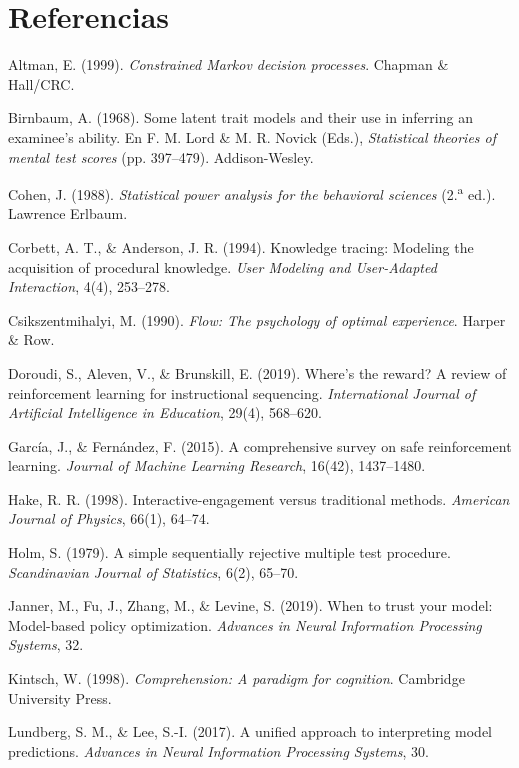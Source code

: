 \documentclass[10.5pt,a4paper]{article}
\begin{document}
\section*{Referencias}
{\small
\begin{list}{}{\setlength{\leftmargin}{1.5em}\setlength{\itemindent}{-1.5em}\setlength{\itemsep}{3pt}\setlength{\parsep}{0pt}}
\item Altman, E. (1999). \textit{Constrained Markov decision processes}. Chapman \& Hall/CRC.
\item Birnbaum, A. (1968). Some latent trait models and their use in inferring an examinee's ability. En F. M. Lord \& M. R. Novick (Eds.), \textit{Statistical theories of mental test scores} (pp. 397--479). Addison-Wesley.
\item Cohen, J. (1988). \textit{Statistical power analysis for the behavioral sciences} (2.\textsuperscript{a} ed.). Lawrence Erlbaum.
\item Corbett, A. T., \& Anderson, J. R. (1994). Knowledge tracing: Modeling the acquisition of procedural knowledge. \textit{User Modeling and User-Adapted Interaction}, 4(4), 253--278.
\item Csikszentmihalyi, M. (1990). \textit{Flow: The psychology of optimal experience}. Harper \& Row.
\item Doroudi, S., Aleven, V., \& Brunskill, E. (2019). Where's the reward? A review of reinforcement learning for instructional sequencing. \textit{International Journal of Artificial Intelligence in Education}, 29(4), 568--620.
\item García, J., \& Fernández, F. (2015). A comprehensive survey on safe reinforcement learning. \textit{Journal of Machine Learning Research}, 16(42), 1437--1480.
\item Hake, R. R. (1998). Interactive-engagement versus traditional methods. \textit{American Journal of Physics}, 66(1), 64--74.
\item Holm, S. (1979). A simple sequentially rejective multiple test procedure. \textit{Scandinavian Journal of Statistics}, 6(2), 65--70.
\item Janner, M., Fu, J., Zhang, M., \& Levine, S. (2019). When to trust your model: Model-based policy optimization. \textit{Advances in Neural Information Processing Systems}, 32.
\item Kintsch, W. (1998). \textit{Comprehension: A paradigm for cognition}. Cambridge University Press.
\item Lundberg, S. M., \& Lee, S.-I. (2017). A unified approach to interpreting model predictions. \textit{Advances in Neural Information Processing Systems}, 30.

\end{list}}
\end{document}
